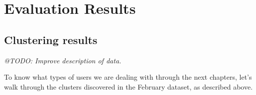 \chapter{Evaluation Results}

\label{AppendixA}



\section{Clustering results}
\label{eval:sec:clustering_results}

\emph{@TODO: Improve description of data.}

To know what types of users we are dealing with through the next chapters, let's walk through the clusters discovered in the February dataset, as described above.

